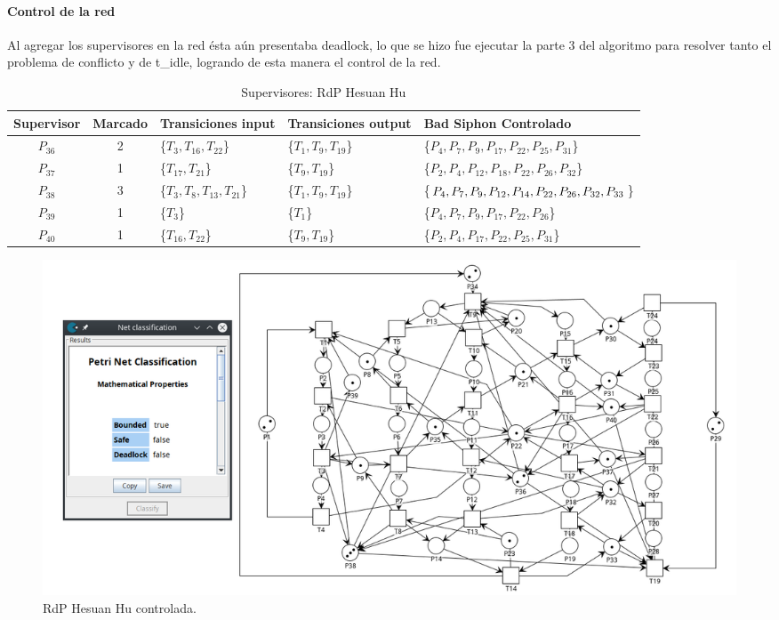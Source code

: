 \paragraph{Control de la red}
\hfill \break
Al agregar los supervisores en la red ésta aún presentaba deadlock, lo que se hizo fue ejecutar la parte 3 del algoritmo para resolver tanto el problema de conflicto y de t\_idle, logrando de esta manera el control de la red.
\begin{table}[H]
    \small
    \centering
    \begin{tabular}{|c|c|P{2.4cm}|P{2.2cm}|P{4.2cm}|}
    \hline
    \textbf{Supervisor} & \textbf{Marcado} & \textbf{Transiciones input} & \textbf{Transiciones output} & \textbf{Bad Siphon Controlado}  \\  \hline
    $P_{36}$ & 2 & \{$T_{3},T_{16},T_{22}$\} & \{$T_{1},T_{9},T_{19}$\} & \{$P_4, P_7, P_{9}, P_{17}, P_{22}, P_{25}, P_{31} $\} \\ 
    \hline
    $P_{37}$ & 1 & \{$T_{17}, T_{21}$\} & \{$T_9,T_{19}$\} & \{$P_2, P_4, P_{12}, P_{18}, P_{22}, P_{26}, P_{32}$\} \\ 
    \hline
    $P_{38}$ & 3 & \{$T_{3}, T_{8}, T_{13}, T_{21}$\} & \{$T_1,T_9, T_{19}$\} & \{$P_4, P_7, P_{9}, P_{12}, P_{14}, P_{22}, P_{26}, \break P_{32}, P_{33}$\} \\ 
    \hline
    $P_{39}$ & 1 & \{$T_{3}$\} & \{$T_1$\} & \{$P_4, P_7, P_{9}, P_{17}, P_{22}, P_{26}$\} \\ 
    \hline
    $P_{40}$ & 1 & \{$T_{16}, T_{22}$\} & \{$T_9,T_{19}$\} & \{$P_2, P_4, P_{17}, P_{22}, P_{25}, P_{31}$\} \\ 
    \hline
    \end{tabular}
    \caption{Supervisores: RdP Hesuan Hu}
    \label{tab:hu}
\end{table}
\hfill

\begin{figure}[H]
	\centering
	\includegraphics[width=\textwidth]{Figures/testing/fig3_sindeadlock.png}
	\caption[RdP Hesuan Hu controlada]{RdP Hesuan Hu controlada.}
	\label{fig:hucontrolada}
 \end{figure}